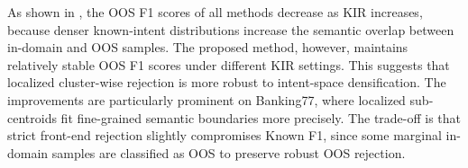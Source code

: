 As shown in , the OOS F1 scores of all methods decrease as KIR increases, because denser known-intent distributions increase the semantic overlap between in-domain and OOS samples. The proposed method, however, maintains relatively stable OOS F1 scores under different KIR settings. This suggests that localized cluster-wise rejection is more robust to intent-space densification. The improvements are particularly prominent on Banking77, where localized sub-centroids fit fine-grained semantic boundaries more precisely. The trade-off is that strict front-end rejection slightly compromises Known F1, since some marginal in-domain samples are classified as OOS to preserve robust OOS rejection.
